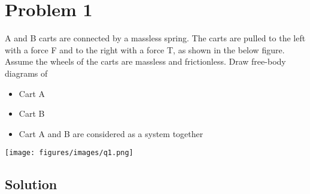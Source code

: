 \section*{Problem 1}

A and B carts are connected by a massless spring.
The carts are pulled to the left with a force F and to the right with a force T, as shown in the below figure.
Assume the wheels of the carts are massless and frictionless.
Draw free-body diagrams of
\begin{itemize}[itemsep=3pt,parsep=0pt,topsep=5pt,partopsep=0pt]
    \item Cart A
    \item Cart B
    \item Cart A and B are considered as a system together
\end{itemize}

\begin{figure*}[h]
    \centering
    \texttt{[image: figures/images/q1.png]}
\end{figure*}

\subsection*{Solution}
